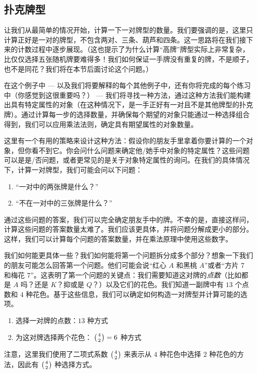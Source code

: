 
\subsection{扑克牌型}

\begin{example}[一对]

    让我们从最简单的情况开始，计算一下一对牌型的数量。我们要强调的是，这里只计算正好是一对的牌型，不包含两对、三条、葫芦和四条。这一思路将在我们接下来的计数过程中逐步展现。（这也提示了为什么计算``高牌''牌型实际上非常复杂，比仅仅选择五张随机牌要难得多！我们如何保证一手牌没有重复的牌，不是顺子，也不是同花？我们将在本节后面讨论这个问题。）

    在这个例子中 --- 以及我们将要解释的每个其他例子中，还有你将完成的每个练习中（你感觉到这很重要吗？） --- 我们将寻找一种方法，通过这种方法我们能构建出具有特定属性的对象（在这种情况下，是一手正好有一对且不是其他牌型的扑克牌）。通过计算每一步的选择数量，并确保每个期望的对象只能通过一种选择组合得到，我们可以应用乘法法则，确定具有期望属性的对象数量。

    这里有一个有用的策略来设计这种方法：假设你的朋友手里拿着你要计算的一个对象，但你看不到它。你会问什么问题来确定他/她手中对象的特定属性？这些问题可以是是/否问题，或者更常见的是关于对象特定属性的询问。在我们的具体情况下，计算一对牌型，我们可能会问以下问题：
    \begin{enumerate}[label=(\arabic*)]
        \item ``一对中的两张牌是什么？''
        \item ``不在一对中的三张牌是什么？''
    \end{enumerate}
    通过这些问题的答案，我们可以完全确定朋友手中的牌。不幸的是，直接这样问，计算这些问题的答案数量太难了。我们应该更具体，并将问题分解成更小的部分。这样，我们可以计算每个问题的答案数量，并在乘法原理中使用这些数字。

    我们如何能更具体一些？我们如何能将第一个问题拆分成多个部分？想象一下我们的朋友可能怎么回答第一个问题。他们可能会说``红心 $A$ 和黑桃 $A$''或者``方片 $7$ 和梅花 $7$''。这表明了第一个问题的关键点：我们需要知道这对牌的\emph{点数}（比如都是 $A$ 吗？还是 $K$？抑或是 $Q$？）以及它们的花色。我们知道一副牌中有 $13$ 个点数和 $4$ 种花色。基于这些信息，我们可以确定如何构造一对牌型并计算可能的选项。
    \begin{enumerate}
        \item 选择一对牌的点数：$13$ 种方式
        \item 为这对牌选择两个花色： $\big({4 \atop 2}\big) = 6$ 种方式
    \end{enumerate}
    注意，这里我们使用了二项式系数 $\big({4 \atop 2}\big)$ 来表示从 $4$ 种花色中选择 $2$ 种花色的方法，因此有 $\big({4 \atop 2}\big)$ 种选择方式。


\end{example}
